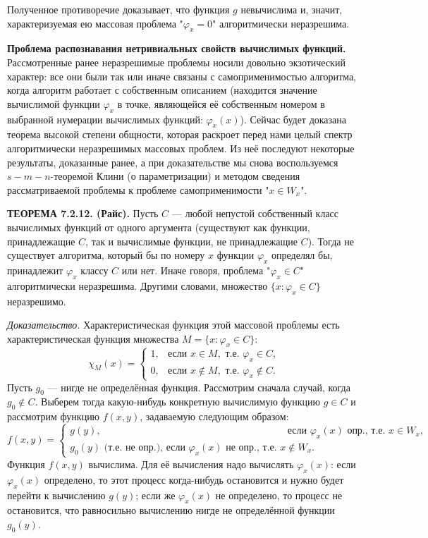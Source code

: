\documentclass[a4paper,12pt]{article}
\begin{document}
Полученное противоречие доказывает, что функция \(g\) невычислима и, значит, характеризуемая ею массовая проблема "\(\varphi_x = 0\)" алгоритмически неразрешима.

\textbf{Проблема распознавания нетривиальных свойств вычислимых функций.} Рассмотренные ранее неразрешимые проблемы носили довольно экзотический характер: все они были так или иначе связаны с самоприменимостью алгоритма, когда алгоритм работает с собственным описанием (находится значение вычислимой функции \(\varphi_x\) в точке, являющейся её собственным номером в выбранной нумерации вычислимых функций: \(\varphi_x(x)\)). Сейчас будет доказана теорема высокой степени общности, которая раскроет перед нами целый спектр алгоритмически неразрешимых массовых проблем. Из неё последуют некоторые результаты, доказанные ранее, а при доказательстве мы снова воспользуемся \(s-m-n\)-теоремой Клини (о параметризации) и методом сведения рассматриваемой проблемы к проблеме самоприменимости "\(x \in W_x\)".

\textbf{ТЕОРЕМА 7.2.12. (Райс).} Пусть \(C\) --- любой непустой собственный класс вычислимых функций от одного аргумента (существуют как функции, принадлежащие \(C\), так и вычислимые функции, не принадлежащие \(C\)). Тогда не существует алгоритма, который бы по номеру \(x\) функции \(\varphi_x\) определял бы, принадлежит \(\varphi_x\) классу \(C\) или нет. Иначе говоря, проблема "\(\varphi_x \in C\)" алгоритмически неразрешима. Другими словами, множество \(\{x : \varphi_x \in C\}\) неразрешимо.

\textit{Доказательство.} Характеристическая функция этой массовой проблемы есть характеристическая функция множества \(M = \{x : \varphi_x \in C\}\):
\[
\chi_M(x) = 
\begin{cases}
1, & \text{если } x \in M, \text{ т.е. } \varphi_x \in C, \\
0, & \text{если } x \notin M, \text{ т.е. } \varphi_x \notin C.
\end{cases}
\]
Пусть \(g_0\) --- нигде не определённая функция. Рассмотрим сначала случай, когда \(g_0 \notin C\). Выберем тогда какую-нибудь конкретную вычислимую функцию \(g \in C\) и рассмотрим функцию \(f(x, y)\), задаваемую следующим образом:
\[
f(x, y) = 
\begin{cases}
g(y), & \text{если } \varphi_x(x) \text{ опр., т.е. } x \in W_x, \\
g_0(y) \text{ (т.е. не опр.), если } \varphi_x(x) \text{ не опр., т.е. } x \notin W_x.
\end{cases}
\]
Функция \(f(x, y)\) вычислима. Для её вычисления надо вычислять \(\varphi_x(x)\): если \(\varphi_x(x)\) определено, то этот процесс когда-нибудь остановится и нужно будет перейти к вычислению \(g(y)\); если же \(\varphi_x(x)\) не определено, то процесс не остановится, что равносильно вычислению нигде не определённой функции \(g_0(y)\).
\end{document}
